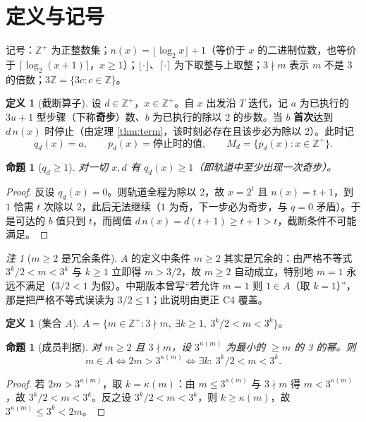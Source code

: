 \documentclass[11pt]{article}
\newtheorem{proposition}[theorem]{命题}
\theoremstyle{definition}\newtheorem{definition}[theorem]{定义}
\theoremstyle{definition}\newtheorem{conjecture}[theorem]{猜想}
\theoremstyle{remark}\newtheorem{remark}[theorem]{注}
\begin{document}
\section{定义与记号}
记号：$\mathbb{Z}^+$ 为正整数集；$n(x)=\lfloor\log_2x\rfloor+1$（等价于 $x$ 的二进制位数，也等价于 $\lceil\log_2(x+1)\rceil$，$x\ge1$）；$\lfloor\cdot\rfloor$、$\lceil\cdot\rceil$ 为下取整与上取整；$3\nmid m$ 表示 $m$ 不是 3 的倍数；$3\mathbb{Z}=\{3c:c\in\mathbb{Z}\}$。
\begin{definition}[截断算子]\label{def:trunc}
设 $d\in\mathbb{Z}^+$，$x\in\mathbb{Z}^+$。自 $x$ 出发沿 $T$ 迭代，记 $a$ 为已执行的 $3u+1$ 型步骤（下称\textbf{奇步}）数、$b$ 为已执行的除以 2 的步数。当 $b$ \textbf{首次}达到 $d\,n(x)$ 时停止（由定理 \ref{thm:term}，该时刻必存在且该步必为除以 2）。此时记
\[q_d(x)=a,\qquad p_d(x)=\text{停止时的值},\qquad M_d=\{p_d(x):x\in\mathbb{Z}^+\}.\]
\end{definition}
\begin{proposition}[$q_d\ge1$]\label{prop:qge}
对一切 $x,d$ 有 $q_d(x)\ge1$（即轨道中至少出现一次奇步）。
\end{proposition}
\begin{proof}
反设 $q_d(x)=0$。则轨道全程为除以 2，故 $x=2^{t}$ 且 $n(x)=t+1$，到 $1$ 恰需 $t$ 次除以 2，此后无法继续（$1$ 为奇，下一步必为奇步，与 $q=0$ 矛盾）。于是可达的 $b$ 值只到 $t$，而阈值 $d\,n(x)=d(t+1)\ge t+1>t$，截断条件不可能满足。
\end{proof}
\begin{remark}[$m\ge2$ 是冗余条件]\label{rem:Ared}
$A$ 的定义中条件 $m\ge2$ 其实是冗余的：由严格不等式 $3^k/2<m<3^k$ 与 $k\ge1$ 立即得 $m>3/2$，故 $m\ge2$ 自动成立，特别地 $m=1$ 永远不满足（$3/2<1$ 为假）。中期版本曾写“若允许 $m=1$ 则 $1\in A$（取 $k=1$）”，那是把严格不等式误读为 $3/2\le1$；此说明由更正 C4 覆盖。
\end{remark}
\begin{definition}[集合 $A$]\label{def:A}
$A=\{m\in\mathbb{Z}^+:3\nmid m,\ \exists k\ge1,\ 3^k/2<m<3^k\}$。
\end{definition}
\begin{proposition}[成员判据]\label{prop:kappa}
对 $m\ge2$ 且 $3\nmid m$，设 $3^{\kappa(m)}$ 为最小的 $\ge m$ 的 3 的幂。则
\[m\in A\iff 2m>3^{\kappa(m)}\iff\exists k:\ 3^k/2<m<3^k.\]
\end{proposition}
\begin{proof}
若 $2m>3^{\kappa(m)}$，取 $k=\kappa(m)$：由 $m\le3^{\kappa(m)}$ 与 $3\nmid m$ 得 $m<3^{\kappa(m)}$，故 $3^k/2<m<3^k$。反之设 $3^k/2<m<3^k$，则 $k\ge\kappa(m)$，故 $3^{\kappa(m)}\le3^k<2m$。
\end{proof}
\end{document}
